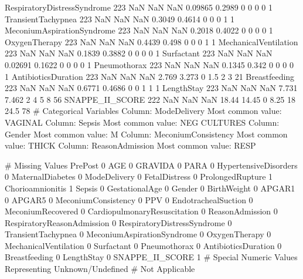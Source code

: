 \documentclass[11pt]{article}
\begin{document}
\begin{codeoutput}
RespiratoryDistressSyndrome     223     NaN           NaN   NaN 0.09865 0.2989    0     0    0    0    1
TransientTachypnea              223     NaN           NaN   NaN  0.3049 0.4614    0     0    0    1    1
MeconiumAspirationSyndrome      223     NaN           NaN   NaN  0.2018 0.4022    0     0    0    0    1
OxygenTherapy                   223     NaN           NaN   NaN  0.4439  0.498    0     0    0    1    1
MechanicalVentilation           223     NaN           NaN   NaN  0.1839 0.3882    0     0    0    0    1
Surfactant                      223     NaN           NaN   NaN 0.02691 0.1622    0     0    0    0    1
Pneumothorax                    223     NaN           NaN   NaN  0.1345  0.342    0     0    0    0    1
AntibioticsDuration             223     NaN           NaN   NaN   2.769  3.273    0   1.5    2    3   21
Breastfeeding                   223     NaN           NaN   NaN  0.6771 0.4686    0     0    1    1    1
LengthStay                      223     NaN           NaN   NaN   7.731  7.462    2     4    5    8   56
SNAPPE\_II\_SCORE                 222     NaN           NaN   NaN   18.44  14.45    0  8.25   18 24.5   78
\# Categorical Variables
Column: ModeDelivery \textbar{} Most common value: VAGINAL
Column: Sepsis \textbar{} Most common value: NEG CULTURES
Column: Gender \textbar{} Most common value: M
Column: MeconiumConsistency \textbar{} Most common value: THICK
Column: ReasonAdmission \textbar{} Most common value: RESP

\# Missing Values
PrePost                         0
AGE                             0
GRAVIDA                         0
PARA                            0
HypertensiveDisorders           0
MaternalDiabetes                0
ModeDelivery                    0
FetalDistress                   0
ProlongedRupture                1
Chorioamnionitis                1
Sepsis                          0
GestationalAge                  0
Gender                          0
BirthWeight                     0
APGAR1                          0
APGAR5                          0
MeconiumConsistency             0
PPV                             0
EndotrachealSuction             0
MeconiumRecovered               0
CardiopulmonaryResuscitation    0
ReasonAdmission                 0
RespiratoryReasonAdmission      0
RespiratoryDistressSyndrome     0
TransientTachypnea              0
MeconiumAspirationSyndrome      0
OxygenTherapy                   0
MechanicalVentilation           0
Surfactant                      0
Pneumothorax                    0
AntibioticsDuration             0
Breastfeeding                   0
LengthStay                      0
SNAPPE\_II\_SCORE                 1
\# Special Numeric Values Representing Unknown/Undefined
\# Not Applicable
\end{codeoutput}
\end{document}

